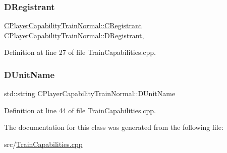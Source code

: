 \subsubsection{\texorpdfstring{D\+Registrant}{DRegistrant}}
{\footnotesize\ttfamily \hyperlink{classCPlayerCapabilityTrainNormal_1_1CRegistrant}{C\+Player\+Capability\+Train\+Normal\+::\+C\+Registrant} C\+Player\+Capability\+Train\+Normal\+::\+D\+Registrant\hspace{0.3cm}{\ttfamily [static]}, {\ttfamily [protected]}}



Definition at line 27 of file Train\+Capabilities.\+cpp.

\hypertarget{classCPlayerCapabilityTrainNormal_aed40686355e78c151910e23ea2d9d32c}{}\label{classCPlayerCapabilityTrainNormal_aed40686355e78c151910e23ea2d9d32c} 
\subsubsection{\texorpdfstring{D\+Unit\+Name}{DUnitName}}
{\footnotesize\ttfamily std\+::string C\+Player\+Capability\+Train\+Normal\+::\+D\+Unit\+Name\hspace{0.3cm}{\ttfamily [protected]}}



Definition at line 44 of file Train\+Capabilities.\+cpp.



The documentation for this class was generated from the following file\+:\begin{DoxyCompactItemize}
\item 
src/\hyperlink{TrainCapabilities_8cpp}{Train\+Capabilities.\+cpp}\end{DoxyCompactItemize}
